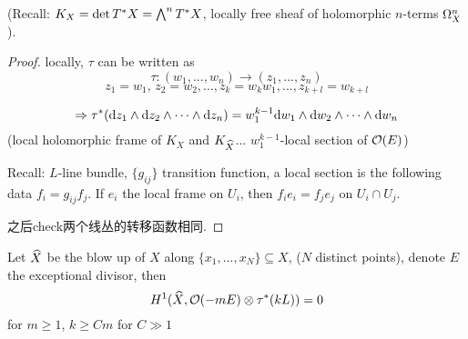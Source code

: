 (Recall: $K_X=\det T^*X=\bigwedge\nolimits^{n}T^*X$,
locally free sheaf of holomorphic $n$-terms $\Omega_X^n$).

\begin{proof}
locally, $\tau$ can be written as
$$\tau:(w_1,...,w_n)\to (z_1,...,z_n)$$
$$z_1=w_1,\,z_2=w_2,...,z_k=w_kw_1,...,z_{k+l}=w_{k+l}$$

$$
  \Rightarrow
  \tau^*(\mathrm{d} z_1\wedge\mathrm{d} z_2\wedge\cdots\wedge\mathrm{d} z_n)
= w_1^{k-1}\mathrm{d} w_1\wedge\mathrm{d} w_2\wedge\cdots\wedge\mathrm{d} w_n
$$
(local holomorphic frame of $K_X$ and $K_{\widehat{X}}$...
$w_1^{k-1}$-local section of $\mathcal{O}(E)$)


Recall: $L$-line bundle, $\{g_{ij}\}$ transition function,
a local section is the following data
$f_i=g_{ij}f_j$. If $e_i$ the local frame on $U_i$, then
$f_ie_i=f_je_j$ on $U_i\cap U_j$.

之后check两个线丛的转移函数相同.
\end{proof}



\begin{lemma}Let $\widehat{X}$ be the blow up of $X$ along
$\{x_1,...,x_N\}\subseteq X$, ($N$ distinct points),
denote $E$ the exceptional divisor, then
$$
  H^1(\widehat{X},\mathcal{O}(-mE)\otimes\tau^*(kL))=0
$$
for $m\geq 1$, $k\geq Cm$ for $C\gg 1$
\end{lemma}

